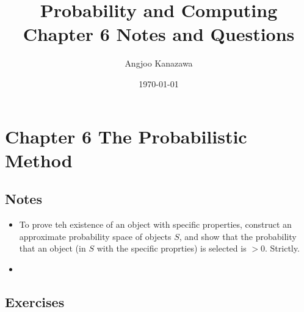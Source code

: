 \documentclass[10pt]{article}
\title{Probability and Computing Chapter 6 Notes and Questions}
\author{Angjoo Kanazawa}
\date{\today}
\begin{document}
\maketitle \thispagestyle{empty}

\section{Chapter 6 The Probabilistic Method}
\label{sec:chap6}


\subsection{Notes}
\begin{itemize}
\item To prove teh existence of an object with specific properties,
  construct an approximate probability space of objects $\mathit{S}$,
  and show that the probability that an object (in $\mathit{S}$ with
  the specific proprties) is selected is $> 0$. Strictly.
\item 
\end{itemize}

\subsection{Exercises}
\end{document}
